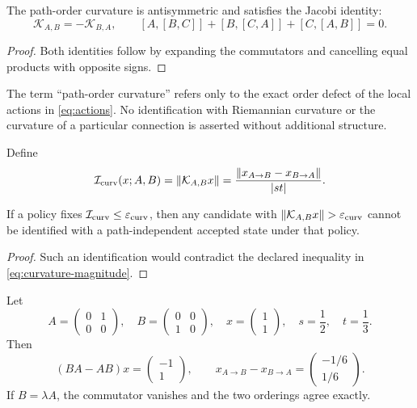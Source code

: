 \begin{proposition}
The path-order curvature is antisymmetric and satisfies the Jacobi identity:
\[
\mathcal K_{A,B}=-\mathcal K_{B,A},
\qquad
[A,[B,C]]+[B,[C,A]]+[C,[A,B]]=0.
\]
\end{proposition}

\begin{proof}
Both identities follow by expanding the commutators and cancelling equal products with opposite signs.
\end{proof}

\begin{remark}
The term ``path-order curvature'' refers only to the exact order defect of the local actions in \cref{eq:actions}. No identification with Riemannian curvature or the curvature of a particular connection is asserted without additional structure.
\end{remark}

\begin{definition}
Define
\begin{equation}
\mathcal I_{\mathrm{curv}}(x;A,B)=\left\lVert\mathcal K_{A,B}x\right\rVert
=\frac{\left\lVert x_{A\to B}-x_{B\to A}\right\rVert}{|st|}.
\label{eq:curvature-magnitude}
\end{equation}
\end{definition}

\begin{proposition}
If a policy fixes $\mathcal I_{\mathrm{curv}}\le\varepsilon_{\mathrm{curv}}$, then any candidate with $\left\lVert\mathcal K_{A,B}x\right\rVert>\varepsilon_{\mathrm{curv}}$ cannot be identified with a path-independent accepted state under that policy.
\end{proposition}

\begin{proof}
Such an identification would contradict the declared inequality in \cref{eq:curvature-magnitude}.
\end{proof}

\begin{example}
Let
\[
A=\begin{pmatrix}0&1\\0&0\end{pmatrix},\quad
B=\begin{pmatrix}0&0\\1&0\end{pmatrix},\quad
x=\begin{pmatrix}1\\1\end{pmatrix},\quad
s=\frac12,\quad t=\frac13.
\]
Then
\[
(BA-AB)x=\begin{pmatrix}-1\\1\end{pmatrix},
\qquad
x_{A\to B}-x_{B\to A}=\begin{pmatrix}-1/6\\1/6\end{pmatrix}.
\]
If $B=\lambda A$, the commutator vanishes and the two orderings agree exactly.
\end{example}

